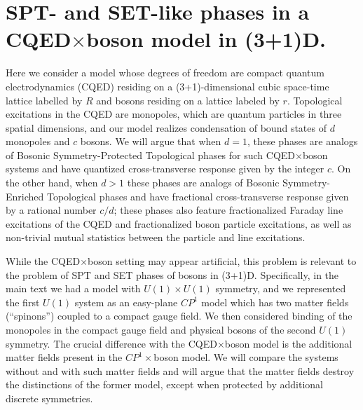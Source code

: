 \documentclass[prb,twocolumn]{revtex4-1}
\newcommand{\cp}{$CP^1$ }
\begin{document}
\section{SPT- and SET-like phases in a CQED$\times$boson model in (3+1)D.}
Here we consider a model whose degrees of freedom are compact quantum electrodynamics (CQED) residing on a (3+1)-dimensional cubic space-time lattice labelled by $R$ and bosons residing on a lattice labeled by $r$.  Topological excitations in the CQED are monopoles, which are quantum particles in three spatial dimensions, and our model realizes condensation of bound states of $d$ monopoles and $c$ bosons.  We will argue that when $d=1$, these phases are analogs of Bosonic Symmetry-Protected Topological phases for such CQED$\times$boson systems and have quantized cross-transverse response given by the integer $c$.  On the other hand, when $d > 1$ these phases are analogs of Bosonic Symmetry-Enriched Topological phases and have fractional cross-transverse response given by a rational number $c/d$; these phases also feature fractionalized Faraday line excitations of the CQED and fractionalized boson particle excitations, as well as non-trivial mutual statistics between the particle and line excitations.  

While the CQED$\times$boson setting may appear artificial, this problem is relevant to the problem of SPT and SET phases of bosons in (3+1)D.  Specifically, in the main text we had a model with $U(1)\times U(1)$ symmetry, and we represented the first $U(1)$ system as an easy-plane \cp model which has two matter fields (``spinons'') coupled to a compact gauge field.
We then considered binding of the monopoles in the compact gauge field and physical bosons of the second $U(1)$ symmetry.  The crucial difference with the CQED$\times$boson model is the additional matter fields present in the $CP^1\times$boson model.  We will compare the systems without and with such matter fields and will argue that the matter fields destroy the distinctions of the former model, except when protected by additional discrete symmetries.

\end{document}
